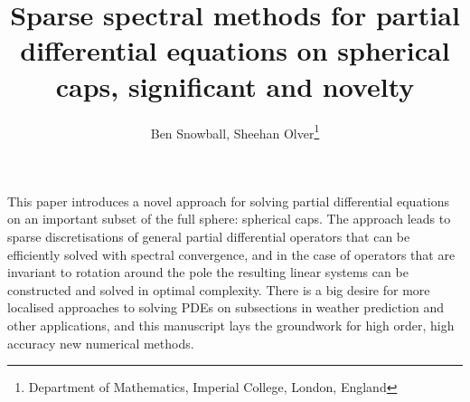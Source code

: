 \documentclass[11pt, oneside]{article}   	%
\title{Sparse spectral methods for partial differential equations on spherical caps, significant and novelty}
\author{Ben Snowball, Sheehan Olver\thanks{Department of Mathematics, Imperial College, London, England}}
\begin{document}
\maketitle

This paper introduces a novel approach for solving partial differential equations on an important subset of the full sphere: spherical caps. The approach leads to sparse discretisations of general partial differential operators that can be efficiently solved with spectral convergence, and in the case of operators that are invariant to rotation around the pole the resulting linear systems can be constructed and solved in optimal complexity. There is a big desire for more localised approaches to solving PDEs on subsections in weather prediction and other applications, and this manuscript lays the groundwork for high order, high accuracy new numerical methods. 
\end{document}
